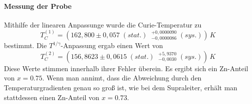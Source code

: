 \documentclass[12pt,a4paper]{article}
\begin{document}
\paragraph{Messung der Probe}
Mithilfe der linearen Anpassunge wurde die Curie-Temperatur zu \begin{equation*}
T_C^{(1)} = (162,800 \pm 0,057 \; (stat.) \; \; ^{+0,0000090}_{-0,0000086} \; (sys.)) \, \si{K}
\end{equation*}
bestimmt. Die $T^{1/\gamma}$-Anpassung ergab einen Wert von \begin{equation*}
T_C^{(2)} = (156,8623 \pm 0,0615 \; (stat.) \; \; ^{+5,9370}_{-0,0030} \; (sys.)) \, \si{K}
\end{equation*}
Diese Werte stimmen innerhalb ihrer Fehler überein. Es ergibt sich ein Zn-Anteil von $x=0.75$. Wenn man annimt, dass die Abweichung durch den Temperaturgradienten genau so groß ist, wie bei dem Supraleiter, erhält man stattdessen einen Zn-Anteil von $x=0.73$.
\end{document}
